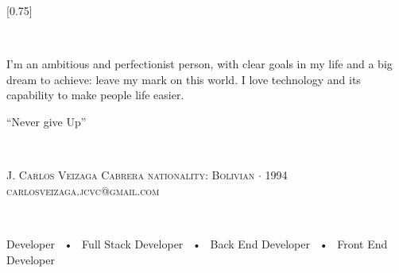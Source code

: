 \documentclass[lighthipster]{simplehipstercv}
\begin{document}
\setlength{\columnsep}{2cm}
[0.75]
\begin{paracol}{2}

\paracolbackgroundoptions


\footnotesize
{\setasidefontcolour
\justifying

\begin{center}
\\[0.5em]
\end{center}

I’m an ambitious and perfectionist person, with clear goals in my life and a big dream to achieve: leave my mark on this world. I love technology and its capability to make people life easier.
\begin{center}
    “Never give Up”
\end{center}

\newline {}
\newline {}

\bigskip

\begin{center}
 \\[0.5em]
\end{center}

\textsc{J. Carlos Veizaga Cabrera}
\newline \textsc{nationality: Bolivian} $\cdot$ \textsc{1994}
\newline \textsc{carlosveizaga.jcvc@gmail.com}

\bigskip

\begin{center}
 \\[0.5em]
\end{center}

Developer ~•~ Full Stack Developer ~•~ Back End Developer ~•~ Front End Developer

\bigskip

\begin{center}
 \\[0.5em]
\end{center}

}
\end{paracol}
\end{document}
